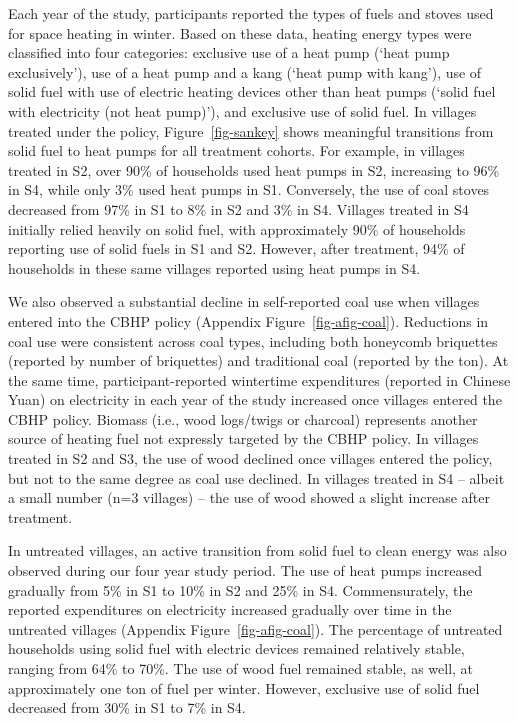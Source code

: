 \documentclass[
  letterpaper,
  DIV=11,
  numbers=noendperiod]{scrartcl}
\begin{document}
Each year of the study, participants reported the types of fuels and
stoves used for space heating in winter. Based on these data, heating
energy types were classified into four categories: exclusive use of a
heat pump (`heat pump exclusively'), use of a heat pump and a kang
(`heat pump with kang'), use of solid fuel with use of electric heating
devices other than heat pumps (`solid fuel with electricity (not heat
pump)'), and exclusive use of solid fuel. In villages treated under the
policy, Figure~\ref{fig-sankey} shows meaningful transitions from solid
fuel to heat pumps for all treatment cohorts. For example, in villages
treated in S2, over 90\% of households used heat pumps in S2, increasing
to 96\% in S4, while only 3\% used heat pumps in S1. Conversely, the use
of coal stoves decreased from 97\% in S1 to 8\% in S2 and 3\% in S4.
Villages treated in S4 initially relied heavily on solid fuel, with
approximately 90\% of households reporting use of solid fuels in S1 and
S2. However, after treatment, 94\% of households in these same villages
reported using heat pumps in S4.

We also observed a substantial decline in self-reported coal use when
villages entered into the CBHP policy (Appendix
Figure~\ref{fig-afig-coal}). Reductions in coal use were consistent
across coal types, including both honeycomb briquettes (reported by
number of briquettes) and traditional coal (reported by the ton). At the
same time, participant-reported wintertime expenditures (reported in
Chinese Yuan) on electricity in each year of the study increased once
villages entered the CBHP policy. Biomass (i.e., wood logs/twigs or
charcoal) represents another source of heating fuel not expressly
targeted by the CBHP policy. In villages treated in S2 and S3, the use
of wood declined once villages entered the policy, but not to the same
degree as coal use declined. In villages treated in S4 -- albeit a small
number (n=3 villages) -- the use of wood showed a slight increase after
treatment.

In untreated villages, an active transition from solid fuel to clean
energy was also observed during our four year study period. The use of
heat pumps increased gradually from 5\% in S1 to 10\% in S2 and 25\% in
S4. Commensurately, the reported expenditures on electricity increased
gradually over time in the untreated villages (Appendix
Figure~\ref{fig-afig-coal}). The percentage of untreated households
using solid fuel with electric devices remained relatively stable,
ranging from 64\% to 70\%. The use of wood fuel remained stable, as
well, at approximately one ton of fuel per winter. However, exclusive
use of solid fuel decreased from 30\% in S1 to 7\% in S4.
\end{document}
